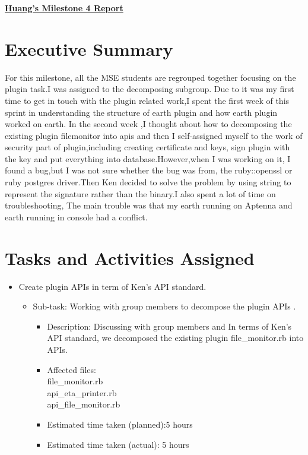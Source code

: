 
\begin{center}
{\large\textbf{\underline{{Huang's Milestone 4 Report}}}}
\end{center}

\section*{Executive Summary}
For this milestone, all the MSE students are regrouped together focusing on the plugin task.I was assigned to the decomposing subgroup. Due to it was my first time to get in touch with the plugin related work,I spent the first week of this sprint in understanding the structure of earth plugin and how earth plugin worked on earth.
In the second week ,I thought about how to decomposing the existing plugin filemonitor into apis and then I self-assigned myself to the work of security part of plugin,including creating certificate and keys, sign plugin with the key and put everything into database.However,when I was working on it, I found a bug,but I was not sure whether the bug was from, the ruby::openssl or ruby postgres driver.Then Ken decided to solve the problem by using string to represent the signature rather than the binary.I also spent a lot of time on troubleshooting, The main trouble was that my earth running on Aptenna and earth running in console had a conflict.

\section*{Tasks and Activities Assigned}

\begin{itemize}
	\item Create plugin APIs in term of Ken's API standard.
	     \begin{itemize}
			 \item  Sub-task: Working with group members to decompose the plugin APIs .
                         \begin{itemize}
					\item Description: Discussing with group members and In terms of Ken's   API standard, we decomposed the existing plugin 
                                        file\_monitor.rb into APIs.
                                        \item Affected files: \\
                                             file\_monitor.rb\\
                                             api\_eta\_printer.rb\\
                                             api\_file\_monitor.rb\\
					\item Estimated time taken (planned):5 hours
					\item Estimated time taken (actual): 5 hours
		       \end{itemize}              
                       \end{itemize}     
           \end{itemize}

